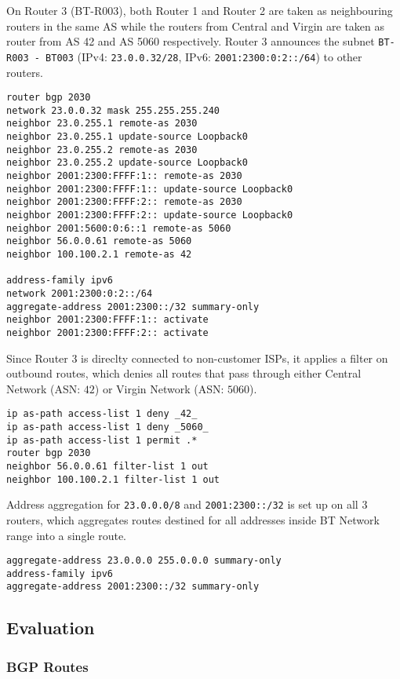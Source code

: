 On Router 3 (BT-R003), both Router 1 and Router 2 are taken as neighbouring routers in the same AS while the routers from Central and Virgin are taken as router from AS 42 and AS 5060 respectively.
Router 3 announces the subnet \texttt{BT-R003 - BT003} (IPv4: \texttt{23.0.0.32/28}, IPv6: \texttt{2001:2300:0:2::/64}) to other routers.

\begin{lstlisting}
router bgp 2030
network 23.0.0.32 mask 255.255.255.240
neighbor 23.0.255.1 remote-as 2030
neighbor 23.0.255.1 update-source Loopback0
neighbor 23.0.255.2 remote-as 2030
neighbor 23.0.255.2 update-source Loopback0
neighbor 2001:2300:FFFF:1:: remote-as 2030
neighbor 2001:2300:FFFF:1:: update-source Loopback0
neighbor 2001:2300:FFFF:2:: remote-as 2030
neighbor 2001:2300:FFFF:2:: update-source Loopback0
neighbor 2001:5600:0:6::1 remote-as 5060
neighbor 56.0.0.61 remote-as 5060
neighbor 100.100.2.1 remote-as 42

address-family ipv6
network 2001:2300:0:2::/64
aggregate-address 2001:2300::/32 summary-only
neighbor 2001:2300:FFFF:1:: activate
neighbor 2001:2300:FFFF:2:: activate
\end{lstlisting}


Since Router 3 is direclty connected to non-customer ISPs, it applies a filter on outbound routes, which denies all routes that pass through either Central Network (ASN: $42$) or Virgin Network (ASN: $5060$).

\begin{lstlisting}
ip as-path access-list 1 deny _42_
ip as-path access-list 1 deny _5060_
ip as-path access-list 1 permit .*
router bgp 2030
neighbor 56.0.0.61 filter-list 1 out
neighbor 100.100.2.1 filter-list 1 out
\end{lstlisting}

Address aggregation for \texttt{23.0.0.0/8} and \texttt{2001:2300::/32} is set up on all 3 routers, which aggregates routes destined for all addresses inside BT Network range into a single route.

\begin{lstlisting}
aggregate-address 23.0.0.0 255.0.0.0 summary-only
address-family ipv6
aggregate-address 2001:2300::/32 summary-only
\end{lstlisting}


\subsection{Evaluation}

\subsubsection{BGP Routes}

